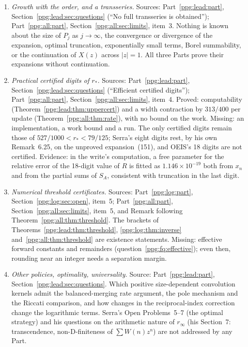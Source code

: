 \documentclass[11pt,letterpaper]{article}
\theoremstyle{remark}\newtheorem{remark}[theorem]{Remark}
\numberwithin{equation}{section}
\begin{document}
\begin{enumerate}[label=\arabic*.,ref=\arabic*]
\item\label{ppg:fq:growth} \emph{Growth with the order, and a transseries.} Sources: Part~\ref{ppg:lead:part}, Section~\ref{ppg:lead:sec:questions} (``No full transseries is obtained''); Part~\ref{ppg:all:part}, Section~\ref{ppg:all:sec:limits}, item~3. Nothing is known about the size of $P_j$ as $j\to\infty$, the convergence or divergence of the expansion, optimal truncation, exponentially small terms, Borel summability, or the continuation of $X(z)$ across $|z|=1$. All three Parts prove their expansions without continuation.
\item\label{ppg:fq:numerics} \emph{Practical certified digits of $r_*$.} Sources: Part~\ref{ppg:lead:part}, Section~\ref{ppg:lead:sec:questions} (``Efficient certified digits''); Part~\ref{ppg:all:part}, Section~\ref{ppg:all:sec:limits}, item~4. Proved: computability (Theorem~\ref{ppg:lead:thm:uppercert}) and a width contraction by $313/400$ per update (Theorem~\ref{ppg:all:thm:rate}), with no bound on the work. Missing: an implementation, a work bound and a run. The only certified digits remain those of $527/1000<r_*<79/125$; Serra's eight digits rest, by his own Remark~6.25, on the unproved expansion~(151), and OEIS's 18 digits are not certified. Evidence: in the write's computation, a free parameter for the relative error of the 18-digit value of $R$ is fitted as $1.146\times10^{-19}$ both from $x_n$ and from the partial sums of $S_A$, consistent with truncation in the last digit.
\item\label{ppg:fq:thresholds} \emph{Numerical threshold certificates.} Sources: Part~\ref{ppg:log:part}, Section~\ref{ppg:log:sec:open}, item~5; Part~\ref{ppg:all:part}, Section~\ref{ppg:all:sec:limits}, item~5, and Remark following Theorem~\ref{ppg:all:thm:threshold}. The brackets of Theorems~\ref{ppg:lead:thm:threshold}, \ref{ppg:log:thm:inverse} and~\ref{ppg:all:thm:threshold} are existence statements. Missing: effective forward constants and remainders (question~\ref{ppg:fq:effective}); even then, rounding near an integer needs a separation margin.
\item\label{ppg:fq:policies} \emph{Other policies, optimality, universality.} Source: Part~\ref{ppg:lead:part}, Section~\ref{ppg:lead:sec:questions}. Which positive size-dependent convolution kernels admit the balanced-merging rate argument, the pole mechanism and the Riccati comparison, and how changes in the reciprocal-index correction change the logarithmic terms. Serra's Open Problems~5--7 (the optimal strategy) and his questions on the arithmetic nature of $r_\infty$ (his Section~7: transcendence, non-D-finiteness of $\sum W(n)z^n$) are not addressed by any Part.

\end{enumerate}
\end{document}
